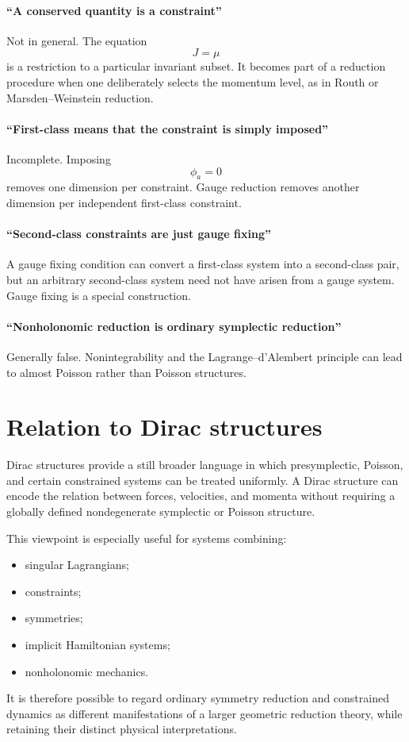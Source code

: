 \paragraph{``A conserved quantity is a constraint''}
Not in general.  The equation
\[
        J=\mu
\]
is a restriction to a particular invariant subset.  It becomes part of a
reduction procedure when one deliberately selects the momentum level, as in
Routh or Marsden--Weinstein reduction.
\paragraph{``First-class means that the constraint is simply imposed''}
Incomplete.  Imposing
\[
        \phi_a=0
\]
removes one dimension per constraint.  Gauge reduction removes another
dimension per independent first-class constraint.

\paragraph{``Second-class constraints are just gauge fixing''}
A gauge fixing condition can convert a first-class system into a second-class
pair, but an arbitrary second-class system need not have arisen from a gauge
system.  Gauge fixing is a special construction.

\paragraph{``Nonholonomic reduction is ordinary symplectic reduction''}
Generally false.  Nonintegrability and the Lagrange--d'Alembert principle can
lead to almost Poisson rather than Poisson structures.

\section{Relation to Dirac structures}

Dirac structures provide a still broader language in which presymplectic,
Poisson, and certain constrained systems can be treated uniformly.  A Dirac
structure can encode the relation between forces, velocities, and momenta
without requiring a globally defined nondegenerate symplectic or Poisson
structure.

This viewpoint is especially useful for systems combining:
\begin{itemize}
\item singular Lagrangians;
\item constraints;
\item symmetries;
\item implicit Hamiltonian systems;
\item nonholonomic mechanics.
\end{itemize}
It is therefore possible to regard ordinary symmetry reduction and constrained
dynamics as different manifestations of a larger geometric reduction theory,
while retaining their distinct physical interpretations.

